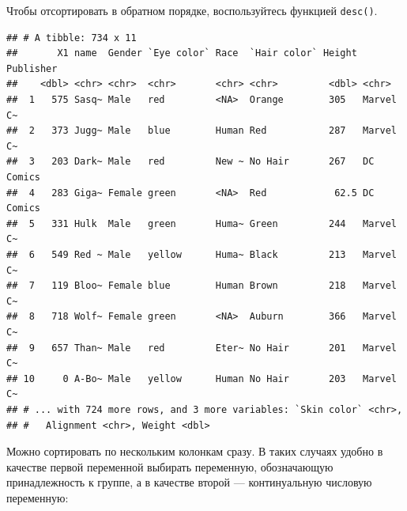 \documentclass[
]{book}
\newenvironment{Shaded}{\begin{snugshade}}{\end{snugshade}}
\newcommand{\KeywordTok}[1]{\textcolor[rgb]{0.13,0.29,0.53}{\textbf{#1}}}
\newcommand{\NormalTok}[1]{#1}
\newcommand{\OperatorTok}[1]{\textcolor[rgb]{0.81,0.36,0.00}{\textbf{#1}}}
\newcommand{\StringTok}[1]{\textcolor[rgb]{0.31,0.60,0.02}{#1}}
\begin{document}
Чтобы отсортировать в обратном порядке, воспользуйтесь функцией \texttt{desc()}.

\begin{Shaded}
\end{Shaded}

\begin{verbatim}
## # A tibble: 734 x 11
##       X1 name  Gender `Eye color` Race  `Hair color` Height Publisher
##    <dbl> <chr> <chr>  <chr>       <chr> <chr>         <dbl> <chr>    
##  1   575 Sasq~ Male   red         <NA>  Orange        305   Marvel C~
##  2   373 Jugg~ Male   blue        Human Red           287   Marvel C~
##  3   203 Dark~ Male   red         New ~ No Hair       267   DC Comics
##  4   283 Giga~ Female green       <NA>  Red            62.5 DC Comics
##  5   331 Hulk  Male   green       Huma~ Green         244   Marvel C~
##  6   549 Red ~ Male   yellow      Huma~ Black         213   Marvel C~
##  7   119 Bloo~ Female blue        Human Brown         218   Marvel C~
##  8   718 Wolf~ Female green       <NA>  Auburn        366   Marvel C~
##  9   657 Than~ Male   red         Eter~ No Hair       201   Marvel C~
## 10     0 A-Bo~ Male   yellow      Human No Hair       203   Marvel C~
## # ... with 724 more rows, and 3 more variables: `Skin color` <chr>,
## #   Alignment <chr>, Weight <dbl>
\end{verbatim}

Можно сортировать по нескольким колонкам сразу. В таких случаях удобно в качестве первой переменной выбирать переменную, обозначающую принадлежность к группе, а в качестве второй --- континуальную числовую переменную:

\begin{Shaded}
\end{Shaded}
\end{document}
